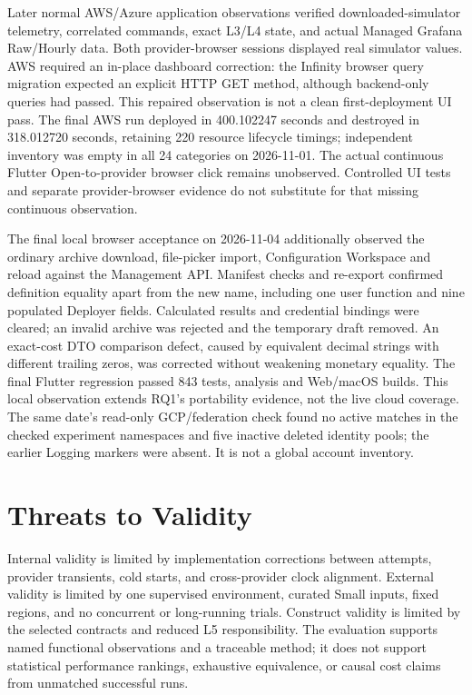 Later normal AWS/Azure application observations verified downloaded-simulator
telemetry, correlated commands, exact L3/L4 state, and actual Managed Grafana
Raw/Hourly data. Both provider-browser sessions displayed real simulator
values. AWS required an in-place dashboard correction: the Infinity browser
query migration expected an explicit HTTP GET method, although backend-only
queries had passed. This repaired observation is not a clean first-deployment
UI pass. The final AWS run deployed in 400.102247 seconds and destroyed in
318.012720 seconds, retaining 220 resource lifecycle timings; independent
inventory was empty in all 24 categories on 2026-11-01. The actual continuous
Flutter Open-to-provider browser click remains unobserved. Controlled UI tests
and separate provider-browser evidence do not substitute for that missing
continuous observation.

The final local browser acceptance on 2026-11-04 additionally observed the
ordinary archive download, file-picker import, Configuration Workspace and
reload against the Management API. Manifest checks and re-export confirmed
definition equality apart from the new name, including one user function and
nine populated Deployer fields. Calculated results and credential bindings
were cleared; an invalid archive was rejected and the temporary draft removed.
An exact-cost DTO comparison defect, caused by equivalent decimal strings with
different trailing zeros, was corrected without weakening monetary equality.
The final Flutter regression passed 843 tests, analysis and Web/macOS builds.
This local observation extends RQ1's portability evidence, not the live cloud
coverage. The same date's read-only GCP/federation check found no active matches
in the checked experiment namespaces and five inactive deleted identity pools;
the earlier Logging markers were absent. It is not a global account inventory.

\section{Threats to Validity}
\label{sec:eval-validity}
Internal validity is limited by implementation corrections between attempts,
provider transients, cold starts, and cross-provider clock alignment. External
validity is limited by one supervised environment, curated Small inputs, fixed
regions, and no concurrent or long-running trials. Construct validity is
limited by the selected contracts and reduced L5 responsibility. The evaluation
supports named functional observations and a traceable method; it does not
support statistical performance rankings, exhaustive equivalence, or causal
cost claims from unmatched successful runs.
